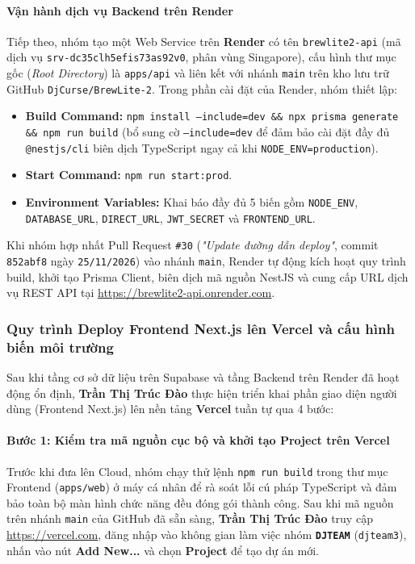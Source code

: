 \paragraph{Vận hành dịch vụ Backend trên Render}
Tiếp theo, nhóm tạo một Web Service trên \textbf{Render} có tên \texttt{brewlite2-api} (mã dịch vụ \texttt{srv-dc35clh5efis73as92v0}, phân vùng Singapore), cấu hình thư mục gốc (\textit{Root Directory}) là \texttt{apps/api} và liên kết với nhánh \texttt{main} trên kho lưu trữ GitHub \texttt{DjCurse/BrewLite-2}. Trong phần cài đặt của Render, nhóm thiết lập:
\begin{itemize}
    \item \textbf{Build Command:} \texttt{npm install --include=dev \&\& npx prisma generate \&\& npm run build} (bổ sung cờ \texttt{--include=dev} để đảm bảo cài đặt đầy đủ \texttt{@nestjs/cli} biên dịch TypeScript ngay cả khi \texttt{NODE\_ENV=production}).
    \item \textbf{Start Command:} \texttt{npm run start:prod}.
    \item \textbf{Environment Variables:} Khai báo đầy đủ 5 biến gồm \texttt{NODE\_ENV}, \texttt{DATABASE\_URL}, \texttt{DIRECT\_URL}, \texttt{JWT\_SECRET} và \texttt{FRONTEND\_URL}.
\end{itemize}

Khi nhóm hợp nhất Pull Request \texttt{\#30} (\textit{"Update đường dẫn deploy"}, commit \texttt{852abf8} ngày \texttt{25/11/2026}) vào nhánh \texttt{main}, Render tự động kích hoạt quy trình build, khởi tạo Prisma Client, biên dịch mã nguồn NestJS và cung cấp URL dịch vụ REST API tại \url{https://brewlite2-api.onrender.com}.

\subsubsection{Quy trình Deploy Frontend Next.js lên Vercel và cấu hình biến môi trường}
Sau khi tầng cơ sở dữ liệu trên Supabase và tầng Backend trên Render đã hoạt động ổn định, \textbf{Trần Thị Trúc Đào} thực hiện triển khai phần giao diện người dùng (Frontend Next.js) lên nền tảng \textbf{Vercel} tuần tự qua 4 bước:

\paragraph{Bước 1: Kiểm tra mã nguồn cục bộ và khởi tạo Project trên Vercel}
Trước khi đưa lên Cloud, nhóm chạy thử lệnh \texttt{npm run build} trong thư mục Frontend (\texttt{apps/web}) ở máy cá nhân để rà soát lỗi cú pháp TypeScript và đảm bảo toàn bộ màn hình chức năng đều đóng gói thành công. Sau khi mã nguồn trên nhánh \texttt{main} của GitHub đã sẵn sàng, \textbf{Trần Thị Trúc Đào} truy cập \url{https://vercel.com}, đăng nhập vào không gian làm việc nhóm \textbf{\texttt{DJTEAM}} (\texttt{djteam3}), nhấn vào nút \textbf{Add New...} và chọn \textbf{Project} để tạo dự án mới.

